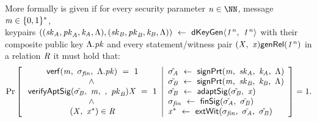 \begin{definition}[\cnstAptSigCorrectness]
    \label{def:aptSigCorrectness}
    More formally \cnstAptSigCorrectness is given if for every security parameter $\varN \in \cnstNatural$, message $\mathit{m} \in \{0,1\}^{*}$, \\ keypairs
    $((\mathit{sk}_{\mathit{A}}, \mathit{pk}_{\mathit{A}}, \mathit{\mathit{k}_{\mathit{A}}}, \Lambda), (\mathit{sk}_{\mathit{B}}, \mathit{pk}_{\mathit{B}}, \mathit{\mathit{k}_{\mathit{B}}}, \Lambda)) ~\leftarrow~ \mathsf{dKeyGen}\langle \mathit{1^n} ,~ \mathit{1^n} \rangle$
    with their composite public key $\Lambda.\mathit{pk}$
    and every statement/witness pair $(\mathit{X} ,~ \mathit{x}) \mathsf{genRel}(\mathit{1^n})$ in a relation $\mathit{R}$ it must hold that:
    \[
        \Pr\left[
        \begin{array}{c}
            \:\mathsf{verf}(\mathit{m} ,~ \sigma_{\mathit{fin}} ,~ \Lambda.\mathit{pk}) ~=~ 1                                         \\
            ~\land~                                                                                              \\
            \: \mathsf{verifyAptSig}(\hat{\sigma_{\mathit{B}}} ,~ \mathit{m} ,~  ,~ \mathit{pk}_{\mathit{B}}){\mathit{X}} ~=~ 1             \\
            ~\land~                                                                                              \\
            \:(\mathit{X} ,~ \mathit{x}^*) \in \mathit{R}
        \end{array}
        \middle\vert
        \begin{array}{l}
            \tilde{\sigma_{\mathit{A}}} ~\leftarrow~ \mathsf{signPrt}(\mathit{m} ,~ \mathit{sk}_{\mathit{A}} ,~ \mathit{\mathit{k}_{\mathit{A}}} ,~ \Lambda)        \\
            \tilde{\sigma_{\mathit{B}}} ~\leftarrow~ \mathsf{signPrt}(\mathit{m} ,~ \mathit{sk}_{\mathit{B}} ,~ \mathit{\mathit{k}_{\mathit{B}}} ,~ \Lambda)              \\
            \hat{\sigma_{\mathit{B}}} ~\leftarrow~ \mathsf{adaptSig}(\tilde{\sigma_{\mathit{B}}} ,~ \mathit{x})                                             \\
            \sigma_{\mathit{fin}} ~\leftarrow~ \mathsf{finSig}(\tilde{\sigma_{\mathit{A}}} ,~ \tilde{\sigma_{\mathit{B}}})                                           \\
            \mathit{x}^* ~\leftarrow~ \mathsf{extWit}(\sigma_{\mathit{fin}} ,~ \tilde{\sigma_{\mathit{A}}} ,~ \hat{\sigma_{\mathit{B}}})
        \end{array}
        \right]=1.
    \]
\end{definition}


